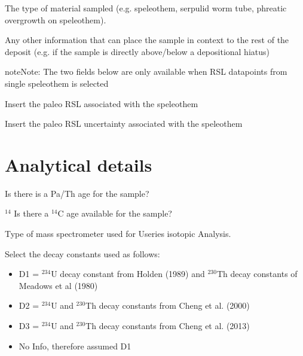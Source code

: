\documentclass[letterpaper,10pt,english]{sphinxmanual}
\begin{document}
 \sphinxhyphen{} The type of material sampled (e.g. speleothem, serpulid worm tube, phreatic overgrowth on speleothem).

 \sphinxhyphen{} Any other information that can place the sample in context to the rest of the deposit (e.g. if the sample is directly above/below a depositional hiatus)

\begin{sphinxadmonition}{note}{Note:}
The two fields below are only available when RSL datapoints from single speleothem is selected
\end{sphinxadmonition}

 \sphinxhyphen{} Insert the paleo RSL associated with the speleothem

 \sphinxhyphen{} Insert the paleo RSL uncertainty associated with the speleothem


\section{Analytical details}
\label{\detokenize{Useries:analytical-details}}
 \sphinxhyphen{} Is there is a Pa/Th age for the sample?

$^{\text{14}}$ \sphinxhyphen{} Is there a $^{\text{14}}$C age available for the sample?

 \sphinxhyphen{} Type of mass spectrometer used for U\sphinxhyphen{}series isotopic Analysis.

 \sphinxhyphen{} Select the decay constants used as follows:
\begin{itemize}
\item {} 
D1 = $^{\text{234}}$U decay constant from Holden (1989) and $^{\text{230}}$Th decay constants of Meadows et al (1980)

\item {} 
D2 = $^{\text{234}}$U and $^{\text{230}}$Th decay constants from Cheng et al. (2000)

\item {} 
D3 = $^{\text{234}}$U and $^{\text{230}}$Th decay constants from Cheng et al. (2013)

\item {} 
No Info, therefore assumed D1

\end{itemize}
\end{document}
